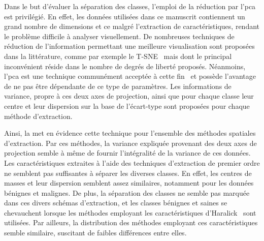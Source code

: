 Dans le but d'évaluer la séparation des classes, l'emploi de la réduction par l'\gls{pca} est privilégié. En effet, les données utilisées dans ce manuscrit contiennent un grand nombre de dimensions et ce malgré l'extraction de caractéristiques, rendant le problème difficile à analyser visuellement. De nombreuses techniques de réduction de l'information permettant une meilleure visualisation sont proposées dans la littérature, comme par exemple le T-SNE~\cite{Maaten2008} mais dont le principal inconvénient réside dans le nombre de degrés de liberté proposés. Néanmoins, l'\gls{pca} est une technique communément acceptée à cette fin~\cite{Himberg2001} et possède l'avantage de ne pas être dépendante de ce type de paramètres. Les informations de variance, propre à ces deux axes de projection, ainsi que pour chaque classe leur centre et leur dispersion sur la base de l'écart-type sont proposées pour chaque méthode d'extraction.\par

Ainsi, la  met en évidence cette technique pour l'ensemble des méthodes spatiales d'extraction. Par ces méthodes, la variance expliquée provenant des deux axes de projection semble à même de fournir l'intégralité de la variance de ces données. Les caractéristiques extraites à l'aide des techniques d'extraction de premier ordre ne semblent pas suffisantes à séparer les diverses classes. En effet, les centres de masses et leur dispersion semblent assez similaires, notamment pour les données bénignes et malignes. De plus, la séparation des classes ne semble pas marquée dans ces divers schémas d'extraction, et les classes bénignes et saines se chevauchent lorsque les méthodes employant les caractéristiques d'Haralick~ sont utilisées. Par ailleurs, la distribution des méthodes employant ces caractéristiques semble similaire, suscitant de faibles différences entre elles.\par


